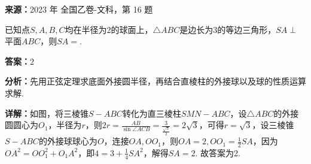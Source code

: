 \begin{question}[points=5]
\textbf{来源：}2023 年 全国乙卷-文科，第 16 题\par
已知点$S,A,B,C$均在半径为2的球面上，$\triangle ABC$是边长为3的等边三角形，$SA\perp$平面$ABC$，则$SA=$.
\fillin[{$2$}]
\begin{solution}
\textbf{答案：}$2$

\textbf{分析：}先用正弦定理求底面外接圆半径，再结合直棱柱的外接球以及球的性质运算求解.

\textbf{详解：}如图，将三棱锥$S-ABC$转化为直三棱柱$SMN-ABC$，设$\triangle ABC$的外接圆圆心为$O_1$，半径为$r$，则$2r=\frac{AB}{\sin\angle ACB}=\frac{3}{\frac{\sqrt{3}}{2}}=2\sqrt{3}$，可得$r=\sqrt{3}$，设三棱锥$S-ABC$的外接球球心为$O$，连接$OA, OO_1$，则$OA=2, OO_1=\frac{1}{2}SA$，因为$OA^2=OO_1^2+O_1A^2$，即$4=3+\frac{1}{4}SA^2$，解得$SA=2$. 故答案为2.
\end{solution}
\end{question}

